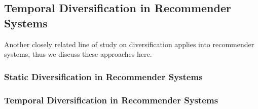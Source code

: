 
\subsection{Temporal Diversification in Recommender Systems}
Another closely related line of study on diversification applies into recommender systems, thus we discuss these approaches here. 
\subsubsection{Static Diversification in Recommender Systems}

\subsubsection{Temporal Diversification in Recommender Systems}
